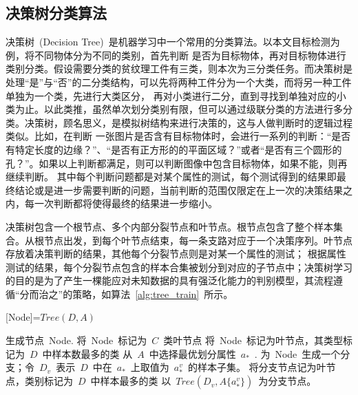 \subsection{决策树分类算法}
\label{sec:random_forest}
决策树\cite{NasrabadiPatternRecognitionMachine2007,WangjueJiQiXueXiJiQiYingYong2006}~(Decision Tree)~是机器学习中一个常用的分类算法。以本文目标检测为例，将不同物体分为不同的类别，首先判断
是否为目标物体，再对目标物体进行类别分类。假设需要分类的贫纹理工件有三类，则本次为三分类任务。而决策树是处理“是”与“否”的二分类结构，可以先将两种工件分为一个大类，而将另一种工件单独为一个类，先进行大类区分，
再对小类进行二分，直到寻找到单独对应的小类为止。以此类推，虽然单次划分类别有限，但可以通过级联分类的方法进行多分类。决策树，顾名思义，是模拟树结构来进行决策的，这与人做判断时的逻辑过程类似。比如，在判断
一张图片是否含有目标物体时，会进行一系列的判断：“是否有特定长度的边缘？”、“是否有正方形的的平面区域？”或者“是否有三个圆形的孔？”。如果以上判断都满足，则可以判断图像中包含目标物体，如果不能，则再继续判断。
其中每个判断问题都是对某个属性的测试，每个测试得到的结果即最终结论或是进一步需要判断的问题，当前判断的范围仅限定在上一次的决策结果之内，每一次判断都将使得最终的结果进一步缩小。

决策树包含一个根节点、多个内部分裂节点和叶节点。根节点包含了整个样本集合。从根节点出发，到每个叶节点结束，每一条支路对应于一个决策序列。叶节点存放着决策判断的结果，其他每个分裂节点则是对某一个属性的测试；
根据属性测试的结果，每个分裂节点包含的样本合集被划分到对应的子节点中；决策树学习的目的是为了产生一棵能应对未知数据的具有强泛化能力的判别模型，其流程遵循“分而治之”的策略\cite{ZhouzhihuaJiQiXueXi2016}，如算法~\ref{alg:tree_train}~所示。

\begin{algorithm}[H]
  \caption{[Node]=$Tree(D,A)$}
  \label{alg:tree_train}
  \begin{algorithmic}[1]
    \State 生成节点~Node.
      \State 将~Node~标记为~$C$~类叶节点 \Return
    \EndIf
      \State 将~Node~标记为叶节点，其类型标记为~$D$~中样本数最多的类 \Return
    \EndIf
    \State 从~$A$~中选择最优划分属性~$a_*$~.
      \State 为~Node~生成一个分支；令~$D_v$~表示~$D$~中在~$a_*$~上取值为~$a_*^v$~的样本子集。
        \State 将分支节点记为叶节点，类别标记为~$D$~中样本最多的类 \Return
      \Else 
        \State 以~$Tree(D_v,A\{a_*^v\})$~为分支节点。
      \EndIf
    \EndFor
    \\
  \end{algorithmic}
\end{algorithm}

